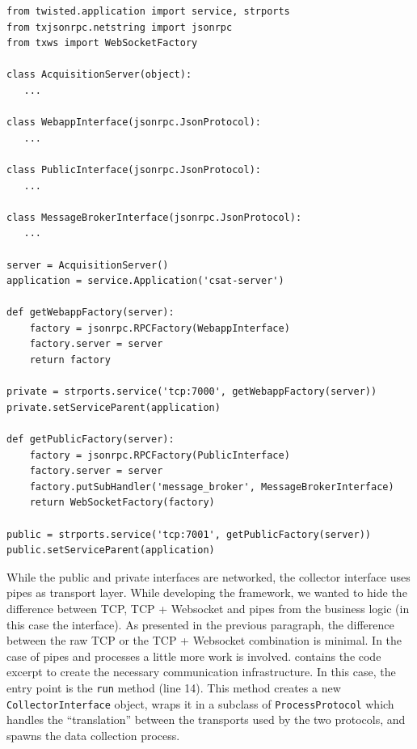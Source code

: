 \begin{lstlisting}[caption={Creation and publication of the public and private interfaces of the acquisition server.},label=lst:interfaces]
from twisted.application import service, strports
from txjsonrpc.netstring import jsonrpc
from txws import WebSocketFactory

class AcquisitionServer(object):
   ...

class WebappInterface(jsonrpc.JsonProtocol):
   ...

class PublicInterface(jsonrpc.JsonProtocol):
   ...

class MessageBrokerInterface(jsonrpc.JsonProtocol):
   ...

server = AcquisitionServer()
application = service.Application('csat-server')

def getWebappFactory(server):
    factory = jsonrpc.RPCFactory(WebappInterface)
    factory.server = server
    return factory

private = strports.service('tcp:7000', getWebappFactory(server))
private.setServiceParent(application)

def getPublicFactory(server):
    factory = jsonrpc.RPCFactory(PublicInterface)
    factory.server = server
    factory.putSubHandler('message_broker', MessageBrokerInterface)
    return WebSocketFactory(factory)

public = strports.service('tcp:7001', getPublicFactory(server))
public.setServiceParent(application)
\end{lstlisting}

While the public and private interfaces are networked, the collector interface uses pipes as transport layer. While developing the framework, we wanted to hide the difference between TCP, TCP + Websocket and pipes from the business logic (in this case the interface). As presented in the previous paragraph, the difference between the raw TCP or the TCP + Websocket combination is minimal. In the case of pipes and processes a little more work is involved.  contains the code excerpt to create the necessary communication infrastructure. In this case, the entry point is the \texttt{run} method (line 14). This method creates a new \texttt{CollectorInterface} object, wraps it in a subclass of \texttt{ProcessProtocol} which handles the ``translation'' between the transports used by the two protocols, and spawns the data collection process.

